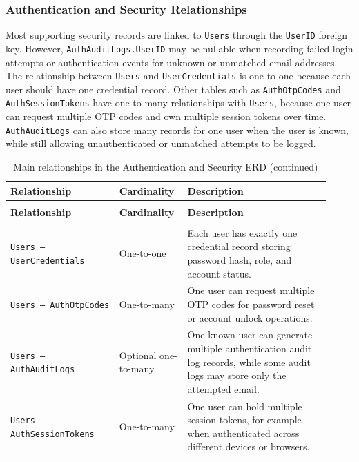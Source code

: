 \documentclass{article}
\begin{document}
\subsubsection{Authentication and Security Relationships}

Most supporting security records are linked to \texttt{Users} through the \texttt{UserID} foreign
key. However, \texttt{AuthAuditLogs.UserID} may be nullable when recording failed login attempts
or authentication events for unknown or unmatched email addresses. The relationship between
\texttt{Users} and \texttt{UserCredentials} is one-to-one because each user should have one
credential record. Other tables such as \texttt{AuthOtpCodes} and \texttt{AuthSessionTokens}
have one-to-many relationships with \texttt{Users}, because one user can request multiple OTP
codes and own multiple session tokens over time. \texttt{AuthAuditLogs} can also store many
records for one user when the user is known, while still allowing unauthenticated or unmatched
attempts to be logged.

\begin{longtable}{
    >{\raggedright\arraybackslash}p{0.32\linewidth}
    >{\centering\arraybackslash}p{0.18\linewidth}
    J{0.42\linewidth}
}
\caption{Main relationships in the Authentication and Security ERD}
\label{tab:auth-security-relationships} \\

\toprule
\textbf{Relationship} & \textbf{Cardinality} & \textbf{Description} \\
\midrule
\endfirsthead

\caption[]{Main relationships in the Authentication and Security ERD (continued)} \\

\toprule
\textbf{Relationship} & \textbf{Cardinality} & \textbf{Description} \\
\midrule
\endhead

\midrule
{} \\
\endfoot

\bottomrule
\endlastfoot

\texttt{Users -- UserCredentials}
& One-to-one
& Each user has exactly one credential record storing password hash, role, and account status. \\

\texttt{Users -- AuthOtpCodes}
& One-to-many
& One user can request multiple OTP codes for password reset or account unlock operations. \\

\texttt{Users -- AuthAuditLogs}
& Optional one-to-many
& One known user can generate multiple authentication audit log records, while some audit logs may store only the attempted email. \\

\texttt{Users -- AuthSessionTokens}
& One-to-many
& One user can hold multiple session tokens, for example when authenticated across different devices or browsers. \\

\end{longtable}
\end{document}
